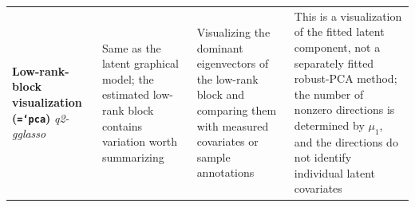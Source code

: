 \documentclass[11pt,a4paper]{article}
\newcommand{\code}[1]{\allowbreak\texttt{\hyphenchar\font=`\-\relax #1}}
\begin{document}
\begin{landscape}
\begin{small}
\begin{longtable}{@{}p{3.2cm}p{6.2cm}p{4.6cm}p{6.4cm}@{}}
\addlinespace
\textbf{Low-rank-block visualization (\code{pca})} \newline \textit{q2-gglasso} &
Same as the latent graphical model; the estimated low-rank block contains variation worth summarizing &
Visualizing the dominant eigenvectors of the low-rank block and comparing them with measured covariates or sample annotations &
This is a visualization of the fitted latent component, not a separately fitted robust-PCA method; the number of nonzero directions is determined by $\mu_1$, and the directions do not identify individual latent covariates \\
\end{longtable}
\end{small}
\end{landscape}
\end{document}
